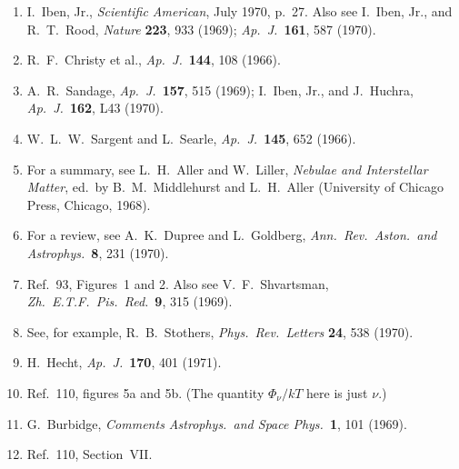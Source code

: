 \begin{enumerate}
  \item{}\label{ch15-ref-131}
  I.~Iben, Jr., \emph{Scientific American}, July 1970, p.~27.
  Also see I.~Iben, Jr., and R.~T.~Rood,
  \emph{Nature} \textbf{223}, 933 (1969);
  \emph{Ap.\ J.}\ \textbf{161}, 587 (1970).

  \item{}\label{ch15-ref-132}
  R.~F.~Christy et al., \emph{Ap.\ J.}\ \textbf{144}, 108 (1966).

  \item{}\label{ch15-ref-133}
  A.~R.~Sandage, \emph{Ap.\ J.}\ \textbf{157}, 515 (1969);
  I.~Iben, Jr., and J.~Huchra,
  \emph{Ap.\ J.}\ \textbf{162}, L43 (1970).

  \item{}\label{ch15-ref-134}
  W.~L.~W.~Sargent and L.~Searle,
  \emph{Ap.\ J.}\ \textbf{145}, 652 (1966).

  \item{}\label{ch15-ref-135}
  For a summary, see L.~H.~Aller and W.~Liller,
  \emph{Nebulae and Interstellar Matter},
  ed.\ by B.~M.~Middlehurst and L.~H.~Aller
  (University of Chicago Press, Chicago, 1968).

  \item{}\label{ch15-ref-136}
  For a review, see A.~K.~Dupree and L.~Goldberg,
  \emph{Ann.\ Rev.\ Aston.\ and Astrophys.}\ \textbf{8}, 231 (1970).

  \item{}\label{ch15-ref-137}
  Ref.~93, Figures~1 and 2. Also see V.~F.~Shvartsman,
  \emph{Zh.\ E.T.F.\ Pis.\ Red.}\ \textbf{9}, 315 (1969).

  \item{}\label{ch15-ref-138}
  See, for example, R.~B.~Stothers,
  \emph{Phys.\ Rev.\ Letters} \textbf{24}, 538 (1970).

  \item{}\label{ch15-ref-139}
  H.~Hecht, \emph{Ap.\ J.}\ \textbf{170}, 401 (1971).

  \item{}\label{ch15-ref-140}
  Ref.~110, figures 5a and 5b.
  (The quantity \(\Phi_\nu/kT\) here is just \(\nu\).)

  \item{}\label{ch15-ref-141}
  G.~Burbidge, \emph{Comments Astrophys.\ and Space Phys.}\
  \textbf{1}, 101 (1969).

  \item{}\label{ch15-ref-142}
  Ref.~110, Section~VII.


\end{enumerate}
